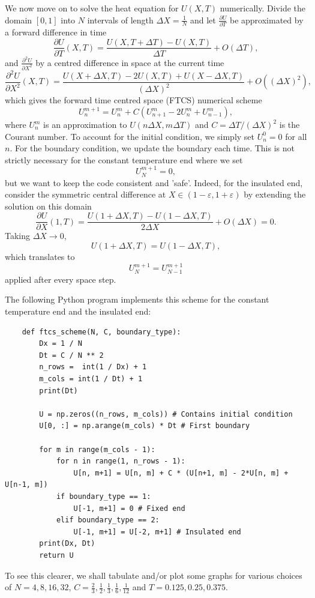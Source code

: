 \documentclass{article}
\newcommand{\pder}[2][]{\frac{\partial#1}{\partial#2}}
\newcommand{\spder}[2][]{\frac{\partial^2#1}{\partial#2^2}}
\begin{document}
We now move on to solve the heat equation for \(U(X,T)\) numerically. Divide the domain \([0,1]\) into \(N\) intervals of length \(\Delta X = \frac{1}{N}\) and let \(\pder[U]{T}\) be approximated by a forward difference in time
\[ \pder[U]{T}(X,T) = \frac{U(X, T + \Delta T) - U(X,T)}{\Delta T} + O(\Delta T), \]
and \(\spder[U]{X}\) by a centred difference in space at the current time
\[ \spder[U]{X}(X, T) = \frac{U(X + \Delta X, T) - 2U(X, T) + U(X - \Delta X, T)}{(\Delta X)^2} + O((\Delta X)^2), \]
which gives the forward time centred space (FTCS) numerical scheme
\[ U_n^{m+1} = U_n^m + C(U_{n+1}^m -2U_n^m + U_{n-1}^m), \]
where \(U_n^m\) is an approximation to \(U(n\Delta X, m\Delta T)\) and \(C = \Delta T / (\Delta X)^2\) is the Courant number. To account for the initial condition, we simply set \(U_n^0 = 0\) for all \(n\). For the boundary condition, we update the boundary each time. This is not strictly necessary for the constant temperature end where we set
\[ U_N^{m+1} = 0,\]
but we want to keep the code consistent and 'safe'. Indeed, for the insulated end, consider the symmetric central difference at \(X \in (1-\varepsilon, 1+\varepsilon)\) by extending the solution on this domain
\[ \pder[U]{X}(1, T) = \frac{U(1+\Delta X, T) - U(1-\Delta X, T)}{2\Delta X} + O(\Delta X) = 0. \]
Taking \(\Delta X \to 0\), 
\[ U(1+\Delta X, T) = U(1-\Delta X, T), \]
which translates to 
\[ U_N^{m+1} = U_{N-1}^{m+1} \]
applied after every space step.

The following Python program implements this scheme for the constant temperature end and the insulated end:

\begin{verbatim}
    def ftcs_scheme(N, C, boundary_type):
        Dx = 1 / N
        Dt = C / N ** 2
        n_rows =  int(1 / Dx) + 1
        m_cols = int(1 / Dt) + 1
        print(Dt)
        
        U = np.zeros((n_rows, m_cols)) # Contains initial condition
        U[0, :] = np.arange(m_cols) * Dt # First boundary
        
        for m in range(m_cols - 1):
            for n in range(1, n_rows - 1):
                U[n, m+1] = U[n, m] + C * (U[n+1, m] - 2*U[n, m] + U[n-1, m])
            if boundary_type == 1:
                U[-1, m+1] = 0 # Fixed end
            elif boundary_type == 2:
                U[-1, m+1] = U[-2, m+1] # Insulated end
        print(Dx, Dt)
        return U
\end{verbatim}

To see this clearer, we shall tabulate and/or plot some graphs for various choices of \(N = 4, 8, 16, 32\), \(C = \frac{2}{3}, \frac{1}{2}, \frac{1}{3}, \frac{1}{6}, \frac{1}{12}\) and \(T = 0.125, 0.25, 0.375\). 
\end{document}
